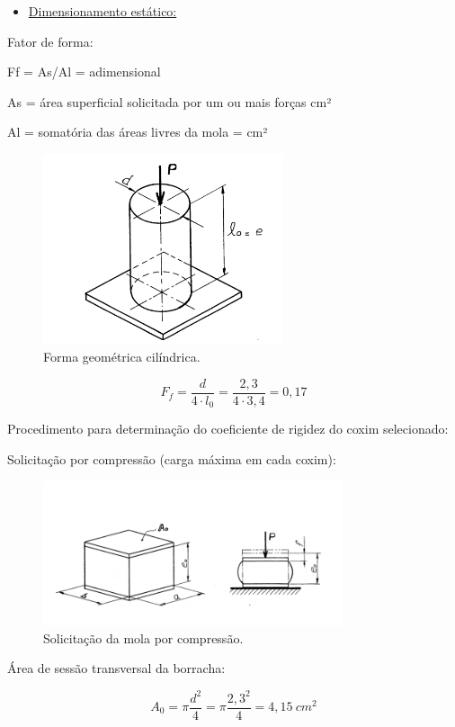 \begin{itemize}
	\item \underline{Dimensionamento estático:}
\end{itemize}

\noindent Fator de forma: 

\noindent Ff = As/Al = adimensional

\noindent As = área superficial solicitada por um ou mais forças cm²

\noindent Al = somatória das áreas livres da mola = cm²

\begin{figure}[H]
	\centering
	\includegraphics[width=200pt]{figuras/forma_cilindro.png}
	\caption{Forma geométrica cilíndrica.}
\end{figure}

\[F_f = \frac{d}{4 \cdot l_0} = \frac{2,3}{4 \cdot 3,4} = 0,17\]


\noindent Procedimento para determinação do coeficiente de rigidez do coxim selecionado:

\noindent Solicitação por compressão (carga máxima em cada coxim):

\begin{figure}[H]
	\centering
	\includegraphics[width=250pt]{figuras/compressao.png}
	\caption{Solicitação da mola por compressão.}
\end{figure}

\noindent Área de sessão transversal da borracha:


\[A_0= \pi \frac{d^2}{4}= \pi \frac{2,3^2}{4} = 4,15 \ cm^2\]


